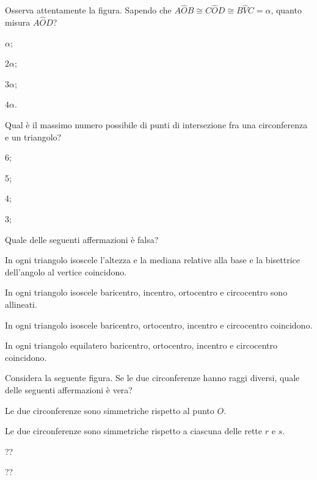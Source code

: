 \begin{esercizio}
\label{ese:5.64}
Osserva attentamente la figura. Sapendo che $A\widehat{O}B\cong C\widehat{O}D\cong B\widehat{V}C=\alpha$, quanto misura $A\widehat{O}D$?
\begin{multicols}{4}
\begin{enumeratea}
\item $\alpha$;
\item $2\alpha$;
\item $3\alpha$;
\item $4\alpha$.
\end{enumeratea}
\end{multicols}
\end{esercizio}

\begin{esercizio}
\label{ese:5.65}
Qual è il massimo numero possibile di punti di intersezione fra una circonferenza e un triangolo?
\begin{multicols}{4}
\begin{enumeratea}
\item 6;
\item 5;
\item 4;
\item 3;
\end{enumeratea}
\end{multicols}
\end{esercizio}

\begin{esercizio}
\label{ese:5.66}
Quale delle seguenti affermazioni è falsa? 
\begin{enumeratea}
\item In ogni triangolo isoscele l'altezza e la mediana relative alla base e la bisettrice dell'angolo al vertice coincidono.
\item In ogni triangolo isoscele baricentro, incentro, ortocentro e circocentro sono allineati.
\item In ogni triangolo isoscele baricentro, ortocentro, incentro e circocentro coincidono.
\item In ogni triangolo equilatero baricentro, ortocentro, incentro e circocentro coincidono.
\end{enumeratea}
\end{esercizio}

\begin{esercizio}
\label{ese:5.67}
Considera la seguente figura. Se le due circonferenze hanno raggi diversi, quale delle seguenti affermazioni è vera?
\begin{enumeratea}
\item Le due circonferenze sono simmetriche rispetto al punto $O$.
\item Le due circonferenze sono simmetriche rispetto a ciascuna delle rette $r$ e $s$.
\item ??
\item ??
\end{enumeratea}
\end{esercizio}

